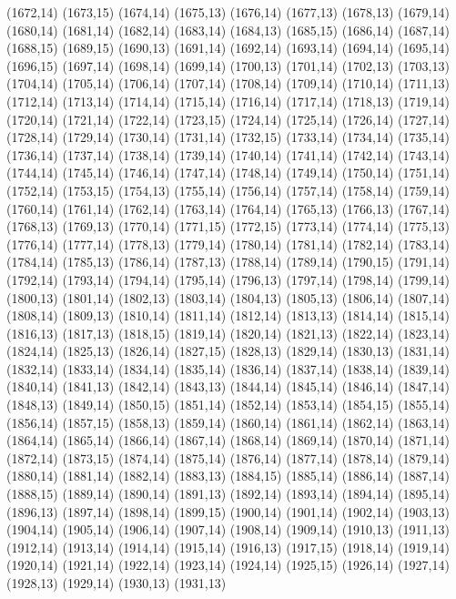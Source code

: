 (1672,14)
(1673,15)
(1674,14)
(1675,13)
(1676,14)
(1677,13)
(1678,13)
(1679,14)
(1680,14)
(1681,14)
(1682,14)
(1683,14)
(1684,13)
(1685,15)
(1686,14)
(1687,14)
(1688,15)
(1689,15)
(1690,13)
(1691,14)
(1692,14)
(1693,14)
(1694,14)
(1695,14)
(1696,15)
(1697,14)
(1698,14)
(1699,14)
(1700,13)
(1701,14)
(1702,13)
(1703,13)
(1704,14)
(1705,14)
(1706,14)
(1707,14)
(1708,14)
(1709,14)
(1710,14)
(1711,13)
(1712,14)
(1713,14)
(1714,14)
(1715,14)
(1716,14)
(1717,14)
(1718,13)
(1719,14)
(1720,14)
(1721,14)
(1722,14)
(1723,15)
(1724,14)
(1725,14)
(1726,14)
(1727,14)
(1728,14)
(1729,14)
(1730,14)
(1731,14)
(1732,15)
(1733,14)
(1734,14)
(1735,14)
(1736,14)
(1737,14)
(1738,14)
(1739,14)
(1740,14)
(1741,14)
(1742,14)
(1743,14)
(1744,14)
(1745,14)
(1746,14)
(1747,14)
(1748,14)
(1749,14)
(1750,14)
(1751,14)
(1752,14)
(1753,15)
(1754,13)
(1755,14)
(1756,14)
(1757,14)
(1758,14)
(1759,14)
(1760,14)
(1761,14)
(1762,14)
(1763,14)
(1764,14)
(1765,13)
(1766,13)
(1767,14)
(1768,13)
(1769,13)
(1770,14)
(1771,15)
(1772,15)
(1773,14)
(1774,14)
(1775,13)
(1776,14)
(1777,14)
(1778,13)
(1779,14)
(1780,14)
(1781,14)
(1782,14)
(1783,14)
(1784,14)
(1785,13)
(1786,14)
(1787,13)
(1788,14)
(1789,14)
(1790,15)
(1791,14)
(1792,14)
(1793,14)
(1794,14)
(1795,14)
(1796,13)
(1797,14)
(1798,14)
(1799,14)
(1800,13)
(1801,14)
(1802,13)
(1803,14)
(1804,13)
(1805,13)
(1806,14)
(1807,14)
(1808,14)
(1809,13)
(1810,14)
(1811,14)
(1812,14)
(1813,13)
(1814,14)
(1815,14)
(1816,13)
(1817,13)
(1818,15)
(1819,14)
(1820,14)
(1821,13)
(1822,14)
(1823,14)
(1824,14)
(1825,13)
(1826,14)
(1827,15)
(1828,13)
(1829,14)
(1830,13)
(1831,14)
(1832,14)
(1833,14)
(1834,14)
(1835,14)
(1836,14)
(1837,14)
(1838,14)
(1839,14)
(1840,14)
(1841,13)
(1842,14)
(1843,13)
(1844,14)
(1845,14)
(1846,14)
(1847,14)
(1848,13)
(1849,14)
(1850,15)
(1851,14)
(1852,14)
(1853,14)
(1854,15)
(1855,14)
(1856,14)
(1857,15)
(1858,13)
(1859,14)
(1860,14)
(1861,14)
(1862,14)
(1863,14)
(1864,14)
(1865,14)
(1866,14)
(1867,14)
(1868,14)
(1869,14)
(1870,14)
(1871,14)
(1872,14)
(1873,15)
(1874,14)
(1875,14)
(1876,14)
(1877,14)
(1878,14)
(1879,14)
(1880,14)
(1881,14)
(1882,14)
(1883,13)
(1884,15)
(1885,14)
(1886,14)
(1887,14)
(1888,15)
(1889,14)
(1890,14)
(1891,13)
(1892,14)
(1893,14)
(1894,14)
(1895,14)
(1896,13)
(1897,14)
(1898,14)
(1899,15)
(1900,14)
(1901,14)
(1902,14)
(1903,13)
(1904,14)
(1905,14)
(1906,14)
(1907,14)
(1908,14)
(1909,14)
(1910,13)
(1911,13)
(1912,14)
(1913,14)
(1914,14)
(1915,14)
(1916,13)
(1917,15)
(1918,14)
(1919,14)
(1920,14)
(1921,14)
(1922,14)
(1923,14)
(1924,14)
(1925,15)
(1926,14)
(1927,14)
(1928,13)
(1929,14)
(1930,13)
(1931,13)
